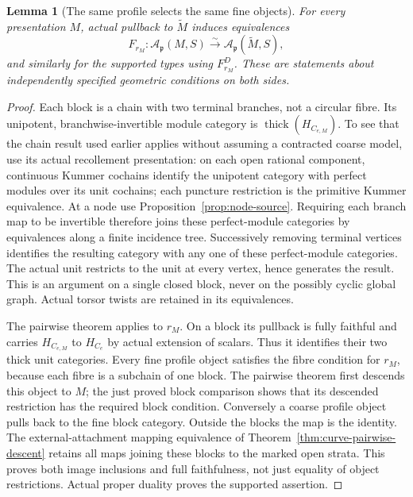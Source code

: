 \documentclass[11pt]{article}
\newtheorem{lemma}[theorem]{Lemma}
\theoremstyle{definition}
\theoremstyle{remark}
\begin{document}
\begin{lemma}[The same profile selects the same fine objects]
\label{lem:profile-images}
For every presentation $M$, actual pullback to $\widetilde M$
induces equivalences
\[
 F_{r_M}:\mathcal A_{\mathfrak p}(M,S)
       \xrightarrow{\sim}\mathcal A_{\mathfrak p}(\widetilde M,S),
\]
and similarly for the supported types using $F_{r_M}^D$.
These are statements about independently specified geometric
conditions on both sides.
\end{lemma}
\begin{proof}
Each block is a chain with two terminal branches, not a circular
fibre.  Its unipotent, branchwise-invertible module category is
$\operatorname{thick}(H_{C_{e,M}})$.  To see that the chain result
used earlier applies without assuming a contracted coarse model,
use its actual recollement presentation: on each open rational
component, continuous Kummer cochains identify the unipotent category
with perfect modules over its unit cochains; each puncture restriction
is the primitive Kummer equivalence.  At a node use
Proposition~\ref{prop:node-source}.  Requiring each branch map to be
invertible therefore joins these perfect-module categories by
equivalences along a finite incidence tree.  Successively removing
terminal vertices identifies the resulting category with any one
of these perfect-module categories.  The actual unit restricts to
the unit at every vertex, hence generates the result.  This is an
argument on a single closed block, never on the possibly cyclic
global graph.  Actual torsor twists are retained in its equivalences.

The pairwise theorem applies to $r_M$.  On a block its pullback is
fully faithful and carries $H_{C_{e,M}}$ to $H_{C_e}$ by actual
extension of scalars.  Thus it identifies their two thick unit
categories.  Every fine profile object satisfies the fibre condition
for $r_M$, because each fibre is a subchain of one block.
The pairwise theorem first descends this object to $M$; the just
proved block comparison shows that its descended restriction has
the required block condition.  Conversely a coarse profile object
pulls back to the fine block category.  Outside the blocks the map
is the identity.  The external-attachment mapping equivalence of
Theorem~\ref{thm:curve-pairwise-descent} retains all maps joining
these blocks to the marked open strata.  This proves both image
inclusions and full faithfulness, not just equality of object
restrictions.  Actual proper duality proves the supported assertion.
\end{proof}
\end{document}
